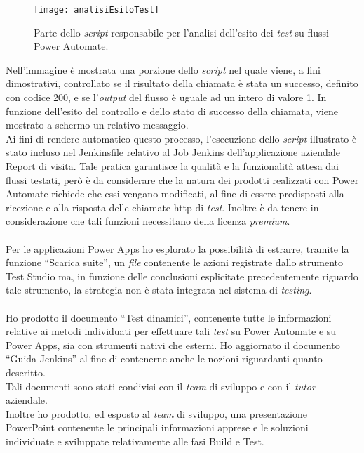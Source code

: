 \begin{figure}[htbp] 
    \centering 
    \texttt{[image: analisiEsitoTest]} 
    \caption{Parte dello \emph{script} responsabile per l'analisi dell'esito dei \emph{test} su flussi Power Automate.}
    \label{fig:analisiEsitoTest}
\end{figure}
\newline Nell'immagine è mostrata una porzione dello \emph{script} nel quale viene, a fini dimostrativi, controllato se il risultato della chiamata è stata un successo, definito con codice 200, e se l'\emph{output} del flusso è uguale ad un intero di valore 1. In funzione dell'esito del controllo e dello stato di successo della chiamata, viene mostrato a schermo un relativo messaggio.\\
Ai fini di rendere automatico questo processo, l'esecuzione dello \emph{script} illustrato è stato incluso nel Jenkinsfile relativo al Job Jenkins dell'applicazione aziendale Report di visita.
Tale pratica garantisce la qualità e la funzionalità attesa dai flussi testati, però è da considerare che la natura dei prodotti realizzati con Power Automate richiede che essi vengano modificati, al fine di essere predisposti alla ricezione e alla risposta delle chiamate \gls{http} di \emph{test}. Inoltre è da tenere in considerazione che tali funzioni necessitano della licenza \emph{premium}.\\\\
Per le applicazioni Power Apps ho esplorato la possibilità di estrarre, tramite la funzione “Scarica suite”, un \emph{file} contenente le azioni registrate dallo strumento Test Studio ma, in funzione delle conclusioni esplicitate precedentemente riguardo tale strumento, la strategia non è stata integrata nel sistema di \emph{testing}.\\\\
Ho prodotto il documento “Test dinamici”, contenente tutte le informazioni relative ai metodi individuati per effettuare tali \emph{test} su Power Automate e su Power Apps, sia con strumenti nativi che esterni. Ho aggiornato il documento “Guida Jenkins” al fine di contenerne anche le nozioni riguardanti quanto descritto.\\
Tali documenti sono stati condivisi con il \emph{team} di sviluppo e con il \emph{\emph{tutor}} aziendale.\\
Inoltre ho prodotto, ed esposto al \emph{team} di sviluppo, una presentazione PowerPoint contenente le principali informazioni apprese e le soluzioni individuate e sviluppate relativamente alle fasi Build e Test. 


